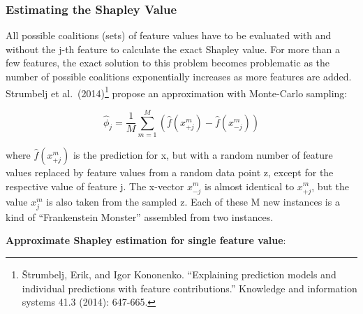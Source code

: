 \documentclass[
  12pt,
]{krantz}
\begin{document}
\hypertarget{estimating-the-shapley-value}{%
\subsubsection{Estimating the Shapley Value}\label{estimating-the-shapley-value}}

All possible coalitions (sets) of feature values have to be evaluated with and without the j-th feature to calculate the exact Shapley value.
For more than a few features, the exact solution to this problem becomes problematic as the number of possible coalitions exponentially increases as more features are added.
Strumbelj et al.~(2014)\footnote{Štrumbelj, Erik, and Igor Kononenko. ``Explaining prediction models and individual predictions with feature contributions.'' Knowledge and information systems 41.3 (2014): 647-665.} propose an approximation with Monte-Carlo sampling:

\[\hat{\phi}_{j}=\frac{1}{M}\sum_{m=1}^M\left(\hat{f}(x^{m}_{+j})-\hat{f}(x^{m}_{-j})\right)\]

where \(\hat{f}(x^{m}_{+j})\) is the prediction for x, but with a random number of feature values replaced by feature values from a random data point z, except for the respective value of feature j.
The x-vector \(x^{m}_{-j}\) is almost identical to \(x^{m}_{+j}\), but the value \(x_j^{m}\) is also taken from the sampled z.
Each of these M new instances is a kind of ``Frankenstein Monster'' assembled from two instances.

\textbf{Approximate Shapley estimation for single feature value}:
\end{document}
